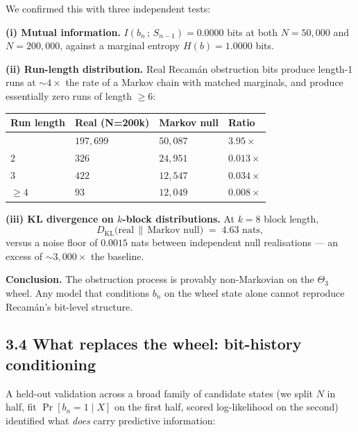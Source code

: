 \documentclass[
  11pt,
]{article}
\begin{document}
We confirmed this with three independent tests:

\textbf{(i) Mutual information.} \(I(b_n \,;\, S_{n-1}) = 0.0000\) bits
at both \(N = 50{,}000\) and \(N = 200{,}000\), against a marginal
entropy \(H(b) = 1.0000\) bits.

\textbf{(ii) Run-length distribution.} Real Recamán obstruction bits
produce length-1 runs at \(\sim 4\times\) the rate of a Markov chain
with matched marginals, and produce essentially zero runs of length
\(\ge 6\):

\begin{longtable}[]{@{}llll@{}}
\toprule\noalign{}
Run length & Real (N=200k) & Markov null & Ratio \\
\midrule\noalign{}
\endhead
\bottomrule\noalign{}
\endlastfoot
1 & \(197{,}699\) & \(50{,}087\) & \(3.95\times\) \\
2 & \(326\) & \(24{,}951\) & \(0.013\times\) \\
3 & \(422\) & \(12{,}547\) & \(0.034\times\) \\
\(\ge 4\) & \(93\) & \(12{,}049\) & \(0.008\times\) \\
\end{longtable}

\textbf{(iii) KL divergence on \(k\)-block distributions.} At \(k = 8\)
block length, \[
D_{\text{KL}}\bigl(\text{real} \,\|\, \text{Markov null}\bigr) \;=\; 4.63 \text{ nats},
\] versus a noise floor of \(0.0015\) nats between independent null
realisations --- an excess of \(\sim 3{,}000\times\) the baseline.

\textbf{Conclusion.} The obstruction process is provably non-Markovian
on the \(\Theta_3\) wheel. Any model that conditions \(b_n\) on the
wheel state alone cannot reproduce Recamán's bit-level structure.

\hypertarget{what-replaces-the-wheel-bit-history-conditioning}{%
\subsection{3.4 What replaces the wheel: bit-history
conditioning}\label{what-replaces-the-wheel-bit-history-conditioning}}

A held-out validation across a broad family of candidate states (we
split \(N\) in half, fit \(\Pr[b_n = 1 \mid X]\) on the first half,
scored log-likelihood on the second) identified what \emph{does} carry
predictive information:
\end{document}
